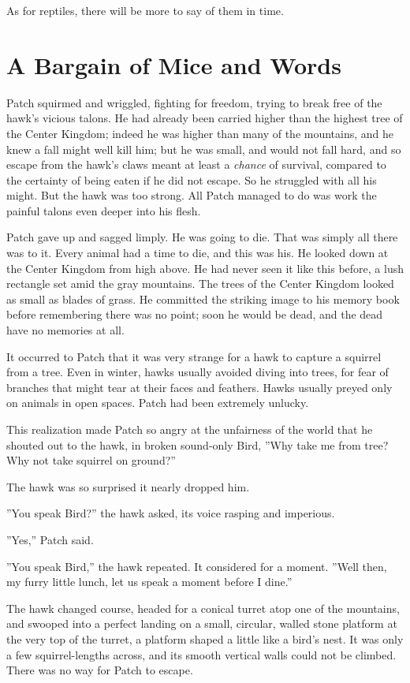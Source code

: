 \documentclass[12pt]{book}
\begin{document}
As for reptiles, there will be more to say of them in time.


\section{A Bargain of Mice and Words}

Patch squirmed and wriggled, fighting for freedom, trying to break
free of the hawk's vicious talons. He had already been carried higher
than the highest tree of the Center Kingdom; indeed he was higher than
many of the mountains, and he knew a fall might well kill him; but he
was small, and would not fall hard, and so escape from the hawk's
claws meant at least a \textit{chance} of survival, compared to the
certainty of being eaten if he did not escape. So he struggled with
all his might. But the hawk was too strong. All Patch managed to do
was work the painful talons even deeper into his flesh.

Patch gave up and sagged limply. He was going to die. That was simply
all there was to it. Every animal had a time to die, and this was
his. He looked down at the Center Kingdom from high above. He had
never seen it like this before, a lush rectangle set amid the gray
mountains. The trees of the Center Kingdom looked as small as blades
of grass. He committed the striking image to his memory book before
remembering there was no point; soon he would be dead, and the dead
have no memories at all.

It occurred to Patch that it was very strange for a hawk to capture a
squirrel from a tree. Even in winter, hawks usually avoided diving
into trees, for fear of branches that might tear at their faces and
feathers. Hawks usually preyed only on animals in open spaces. Patch
had been extremely unlucky.

This realization made Patch so angry at the unfairness of the world
that he shouted out to the hawk, in broken sound-only Bird, ''Why take
me from tree? Why not take squirrel on ground?''

The hawk was so surprised it nearly dropped him.

''You speak Bird?'' the hawk asked, its voice rasping and imperious.

''Yes,'' Patch said.

''You speak Bird,'' the hawk repeated. It considered for a
moment. ''Well then, my furry little lunch, let us speak a moment
before I dine.''

The hawk changed course, headed for a conical turret atop one of the
mountains, and swooped into a perfect landing on a small, circular,
walled stone platform at the very top of the turret, a platform shaped
a little like a bird's nest. It was only a few squirrel-lengths
across, and its smooth vertical walls could not be climbed. There was
no way for Patch to escape.
\end{document}
